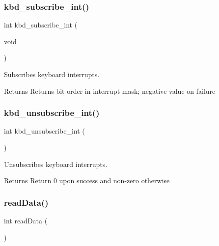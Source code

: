 \subsubsection{\texorpdfstring{kbd\+\_\+subscribe\+\_\+int()}{kbd\_subscribe\_int()}}
{\footnotesize\ttfamily int kbd\+\_\+subscribe\+\_\+int (\begin{DoxyParamCaption}\item[{void}]{ }\end{DoxyParamCaption})}



Subscribes keyboard interrupts. 

\begin{DoxyReturn}{Returns}
Returns bit order in interrupt mask; negative value on failure 
\end{DoxyReturn}
\mbox{\label{group___keyboard_ga5bdf6cfb570c375192b0d87913b65c57}} 
\subsubsection{\texorpdfstring{kbd\+\_\+unsubscribe\+\_\+int()}{kbd\_unsubscribe\_int()}}
{\footnotesize\ttfamily int kbd\+\_\+unsubscribe\+\_\+int (\begin{DoxyParamCaption}{ }\end{DoxyParamCaption})}



Unsubscribes keyboard interrupts. 

\begin{DoxyReturn}{Returns}
Return 0 upon success and non-\/zero otherwise 
\end{DoxyReturn}
\mbox{\label{group___keyboard_ga7038ddb0c35ef732a786679094a9de0e}} 
\subsubsection{\texorpdfstring{read\+Data()}{readData()}}
{\footnotesize\ttfamily int read\+Data (\begin{DoxyParamCaption}{ }\end{DoxyParamCaption})}



